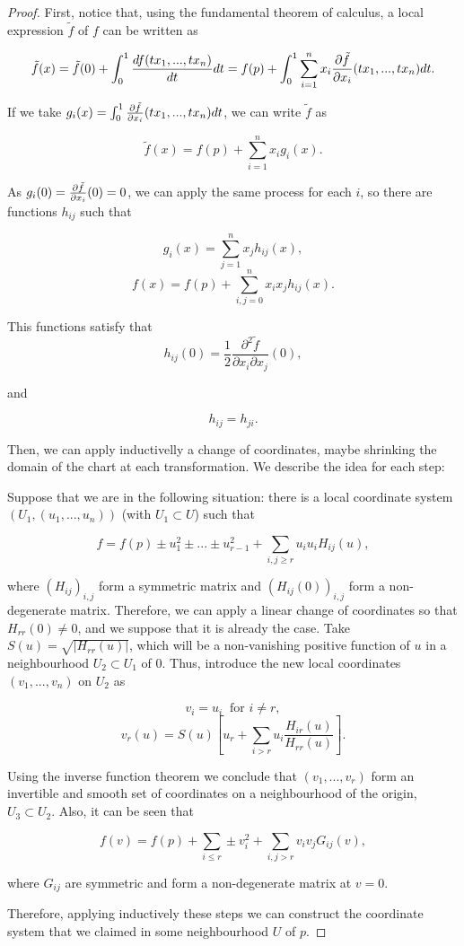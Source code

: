 \begin{proof} First, notice that, using the fundamental theorem of calculus, a local expression $\tilde{f}$ of $f$ can be written as

$$\tilde{f}(x) = \tilde{f}(0) + \int_0^1 \frac{df(tx_1,...,tx_n)}{dt} dt = f(p) + \int_0^1 \sum_{i=1}^n x_i \frac{\partial \tilde{f}}{\partial x_i}(tx_1,...,tx_n) dt .$$

If we take $g_i(x) = \int_0^1 \frac{\partial \tilde{f}}{\partial x_i}(tx_1,...,tx_n) dt$, we can write $\tilde{f}$ as

$$\tilde{f}(x) = f(p) + \sum_{i=1}^n x_i g_i(x) .$$

As $g_i(0) = \frac{\partial \tilde{f}}{\partial x_i}(0) = 0$, we can apply the same process for each $i$, so there are functions $h_{ij}$ such that

$$g_i(x) = \sum_{j=1}^n x_j h_{ij}(x) ,$$
$$f(x) = f(p) + \sum_{i,j=0}^n x_i x_j h_{ij}(x) .$$

This functions satisfy that
$$h_{ij}(0) = \frac12 \frac{\partial^2 \tilde{f}}{\partial x_i \partial x_j}(0) ,$$

and

$$h_{ij} = h_{ji} .$$

Then, we can apply inductivelly a change of coordinates, maybe shrinking the domain of the chart at each transformation. We describe the idea for each step:

Suppose that we are in the following situation: there is a local coordinate system $(U_1, (u_1,...,u_n))$ (with $U_1 \subset U$) such that

$$f = f(p) \pm u_1^2 \pm ... \pm u_{r-1}^2 + \sum_{i,j \geq r} u_i u_i H_{ij}(u) ,$$

where $(H_{ij})_{i,j}$ form a symmetric matrix and $(H_{ij}(0))_{i,j}$ form a non-degenerate matrix. Therefore, we can apply a linear change of coordinates so that $H_{rr}(0) \neq 0$, and we suppose that it is already the case. Take $S(u) = \sqrt{|H_{rr}(u)|}$, which will be a non-vanishing positive function of $u$ in a neighbourhood $U_2 \subset U_1$ of $0$. Thus, introduce the new local coordinates $(v_1,...,v_n)$ on $U_2$ as

$$v_i = u_i \ \text{ for } i \neq r,$$
$$v_r(u) = S(u) \left[ u_r + \sum_{i > r} u_i \frac{H_{ir}(u)}{H_{rr}(u)} \right] .$$

Using the inverse function theorem we conclude that $(v_1,...,v_r)$ form an invertible and smooth set of coordinates on a neighbourhood of the origin, $U_3 \subset U_2$. Also, it can be seen that

$$f(v) = f(p) + \sum_{i \leq r} \pm v_i^2 + \sum_{i,j > r} v_i v_j G_{ij}(v) ,$$

where $G_{ij}$ are symmetric and form a non-degenerate matrix at $v = 0$.

Therefore, applying inductively these steps we can construct the coordinate system that we claimed in some neighbourhood $U$ of $p$.
\end{proof}

